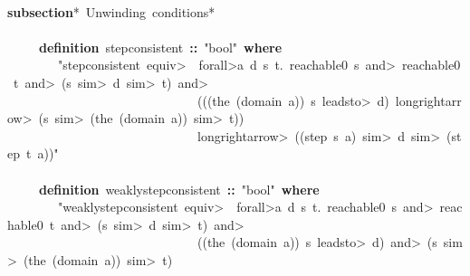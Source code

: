 \documentclass{article}
\newcommand{\syntaxCOMMENTC}[1]{\textcolor[rgb]{0.4,0.0,0.8}{#1}}
\newcommand{\syntaxKEYWORDA}[1]{\textcolor[rgb]{0.0,0.4,0.6}{\textbf{#1}}}
\newcommand{\syntaxKEYWORDB}[1]{\textcolor[rgb]{0.0,0.6,0.4}{\textbf{#1}}}
\newcommand{\syntaxLITERALA}[1]{\textcolor[rgb]{1.0,0.0,0.8}{#1}}
\newcommand{\syntaxOPERATOR}[1]{\textcolor[rgb]{0.0,0.0,0.0}{\textbf{#1}}}
\newcommand{\syntaxCOMMENTC}[1]{\textcolor[rgb]{0.4,0.0,0.8}{#1}}
\newcommand{\syntaxKEYWORDA}[1]{\textcolor[rgb]{0.0,0.4,0.6}{\textbf{#1}}}
\newcommand{\syntaxKEYWORDB}[1]{\textcolor[rgb]{0.0,0.6,0.4}{\textbf{#1}}}
\newcommand{\syntaxLITERALA}[1]{\textcolor[rgb]{1.0,0.0,0.8}{#1}}
\newcommand{\syntaxOPERATOR}[1]{\textcolor[rgb]{0.0,0.0,0.0}{\textbf{#1}}}
\newcommand{\syntaxCOMMENTC}[1]{\textcolor[rgb]{0.4,0.0,0.8}{#1}}
\newcommand{\syntaxKEYWORDA}[1]{\textcolor[rgb]{0.0,0.4,0.6}{\textbf{#1}}}
\newcommand{\syntaxKEYWORDB}[1]{\textcolor[rgb]{0.0,0.6,0.4}{\textbf{#1}}}
\newcommand{\syntaxLITERALA}[1]{\textcolor[rgb]{1.0,0.0,0.8}{#1}}
\newcommand{\syntaxOPERATOR}[1]{\textcolor[rgb]{0.0,0.0,0.0}{\textbf{#1}}}
\newcommand{\syntaxCOMMENTC}[1]{\textcolor[rgb]{0.4,0.0,0.8}{\textbf{#1}}}
\newcommand{\syntaxKEYWORDA}[1]{\textcolor[rgb]{0.0,0.4,0.6}{#1}}
\newcommand{\syntaxKEYWORDB}[1]{\textcolor[rgb]{0.0,0.6,0.4}{#1}}
\newcommand{\syntaxLITERALA}[1]{\textcolor[rgb]{1.0,0.0,0.8}{\textbf{#1}}}
\newcommand{\syntaxOPERATOR}[1]{\textcolor[rgb]{0.0,0.0,0.0}{#1}}
\newcommand{\syntaxCOMMENTC}[1]{\textcolor[rgb]{0.4,0.0,0.8}{#1}}
\newcommand{\syntaxKEYWORDA}[1]{\textcolor[rgb]{0.0,0.4,0.6}{\textbf{#1}}}
\newcommand{\syntaxKEYWORDB}[1]{\textcolor[rgb]{0.0,0.6,0.4}{\textbf{#1}}}
\newcommand{\syntaxLITERALA}[1]{\textcolor[rgb]{1.0,0.0,0.8}{#1}}
\newcommand{\syntaxOPERATOR}[1]{\textcolor[rgb]{0.0,0.0,0.0}{\textbf{#1}}}
\newcommand{\syntaxCOMMENTC}[1]{\textcolor[rgb]{0.4,0.0,0.8}{#1}}
\newcommand{\syntaxKEYWORDA}[1]{\textcolor[rgb]{0.0,0.4,0.6}{\textbf{#1}}}
\newcommand{\syntaxKEYWORDB}[1]{\textcolor[rgb]{0.0,0.6,0.4}{\textbf{#1}}}
\newcommand{\syntaxLITERALA}[1]{\textcolor[rgb]{1.0,0.0,0.8}{#1}}
\newcommand{\syntaxOPERATOR}[1]{\textcolor[rgb]{0.0,0.0,0.0}{\textbf{#1}}}
\begin{document}
\hspace*{\fill}\\
\syntaxKEYWORDA{subsection}\syntaxCOMMENTC{\usebox{\opencurlybracket}*{\ }Unwinding{\ }conditions*\usebox{\closecurlybracket}}\hspace*{\fill}\\
\hspace*{\fill}\\
{\ }{\ }{\ }{\ }{\ }\syntaxKEYWORDA{definition}{\ }step\usebox{\underscorebox}consistent{\ }\syntaxOPERATOR{::}{\ }\syntaxLITERALA{"bool"}{\ }\syntaxKEYWORDB{where}{\ }\hspace*{\fill}\\
{\ }{\ }{\ }{\ }{\ }{\ }{\ }{\ }\syntaxLITERALA{"step\usebox{\underscorebox}consistent{\ }\<equiv>{\ }{\ }\<forall>a{\ }d{\ }s{\ }t.{\ }reachable0{\ }s{\ }\<and>{\ }reachable0{\ }t{\ }\<and>{\ }(s{\ }\<sim>{\ }d{\ }\<sim>{\ }t){\ }\<and>{\ }}\hspace*{\fill}\\
\syntaxLITERALA{{\ }{\ }{\ }{\ }{\ }{\ }{\ }{\ }{\ }{\ }{\ }{\ }{\ }{\ }{\ }{\ }{\ }{\ }{\ }{\ }{\ }{\ }{\ }{\ }{\ }{\ }{\ }{\ }{\ }{\ }(((the{\ }(domain{\ }a)){\ }\usebox{\atbox}{\ }s{\ }\<leadsto>{\ }d){\ }\<longrightarrow>{\ }(s{\ }\<sim>{\ }(the{\ }(domain{\ }a)){\ }\<sim>{\ }t))}\hspace*{\fill}\\
\syntaxLITERALA{{\ }{\ }{\ }{\ }{\ }{\ }{\ }{\ }{\ }{\ }{\ }{\ }{\ }{\ }{\ }{\ }{\ }{\ }{\ }{\ }{\ }{\ }{\ }{\ }{\ }{\ }{\ }{\ }{\ }{\ }\<longrightarrow>{\ }((step{\ }s{\ }a){\ }\<sim>{\ }d{\ }\<sim>{\ }(step{\ }t{\ }a))"}\hspace*{\fill}\\
\hspace*{\fill}\\
{\ }{\ }{\ }{\ }{\ }\syntaxKEYWORDA{definition}{\ }weakly\usebox{\underscorebox}step\usebox{\underscorebox}consistent{\ }\syntaxOPERATOR{::}{\ }\syntaxLITERALA{"bool"}{\ }\syntaxKEYWORDB{where}{\ }\hspace*{\fill}\\
{\ }{\ }{\ }{\ }{\ }{\ }{\ }{\ }\syntaxLITERALA{"weakly\usebox{\underscorebox}step\usebox{\underscorebox}consistent{\ }\<equiv>{\ }{\ }\<forall>a{\ }d{\ }s{\ }t.{\ }reachable0{\ }s{\ }\<and>{\ }reachable0{\ }t{\ }\<and>{\ }(s{\ }\<sim>{\ }d{\ }\<sim>{\ }t){\ }\<and>}\hspace*{\fill}\\
\syntaxLITERALA{{\ }{\ }{\ }{\ }{\ }{\ }{\ }{\ }{\ }{\ }{\ }{\ }{\ }{\ }{\ }{\ }{\ }{\ }{\ }{\ }{\ }{\ }{\ }{\ }{\ }{\ }{\ }{\ }{\ }{\ }((the{\ }(domain{\ }a)){\ }\usebox{\atbox}{\ }s{\ }\<leadsto>{\ }d){\ }\<and>{\ }(s{\ }\<sim>{\ }(the{\ }(domain{\ }a)){\ }\<sim>{\ }t){\ }}\hspace*{\fill}\\
\end{document}

